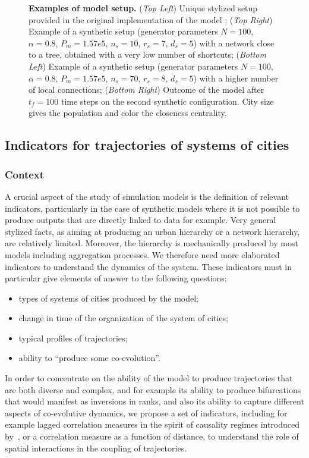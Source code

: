 \begin{figure}
	\caption{\textbf{Examples of model setup.} (\textit{Top Left}) Unique stylized setup provided in the original implementation of the model \cite{schmitt2014modelisation}; (\textit{Top Right}) Example of a synthetic setup (generator parameters $N=100$, $\alpha=0.8$, $P_m =1.57e5$, $n_s = 10$, $r_s=7$, $d_s = 5$) with a network close to a tree, obtained with a very low number of shortcuts; (\textit{Bottom Left}) Example of a synthetic setup (generator parameters $N=100$, $\alpha=0.8$, $P_m =1.57e5$, $n_s = 70$, $r_s=8$, $d_s = 5$) with a higher number of local connections; (\textit{Bottom Right}) Outcome of the model after $t_f = 100$ time steps on the second synthetic configuration. City size gives the population and color the closeness centrality.\label{fig:exsetup}}
\end{figure}



\subsection{Indicators for trajectories of systems of cities}

\subsubsection{Context}

A crucial aspect of the study of simulation models is the definition of relevant indicators, particularly in the case of synthetic models where it is not possible to produce outputs that are directly linked to data for example. Very general stylized facts, as aiming at producing an urban hierarchy or a network hierarchy, are relatively limited. Moreover, the hierarchy is mechanically produced by most models including aggregation processes. We therefore need more elaborated indicators to understand the dynamics of the system. These indicators must in particular give elements of answer to the following questions:
\begin{itemize}
	\item types of systems of cities produced by the model;
	\item change in time of the organization of the system of cities;
	\item typical profiles of trajectories;
	\item ability to ``produce some co-evolution''.
\end{itemize}


In order to concentrate on the ability of the model to produce trajectories that are both diverse and complex, and for example its ability to produce bifurcations that would manifest as inversions in ranks, and also its ability to capture different aspects of co-evolutive dynamics, we propose a set of indicators, including for example lagged correlation measures in the spirit of causality regimes introduced by~\cite{raimbault2017identification}, or a correlation measure as a function of distance, to understand the role of spatial interactions in the coupling of trajectories.

